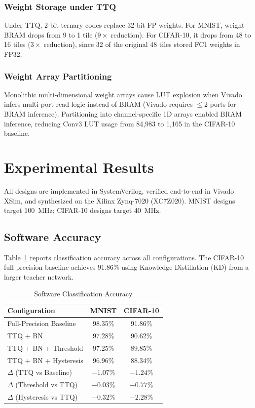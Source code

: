 \documentclass[conference]{IEEEtran}
\begin{document}
\subsubsection{Weight Storage under TTQ}
Under TTQ, 2-bit ternary codes replace 32-bit FP weights. For MNIST, weight BRAM drops from 9 to 1 tile ($9\times$ reduction). For CIFAR-10, it drops from 48 to 16 tiles ($3\times$ reduction), since 32 of the original 48 tiles stored FC1 weights in FP32.

\subsubsection{Weight Array Partitioning}
Monolithic multi-dimensional weight arrays cause LUT explosion when Vivado infers multi-port read logic instead of BRAM (Vivado requires $\leq$2 ports for BRAM inference). Partitioning into channel-specific 1D arrays enabled BRAM inference, reducing Conv3 LUT usage from 84,983 to 1,165 in the CIFAR-10 baseline.


\section{Experimental Results}
\label{sec:results}

All designs are implemented in SystemVerilog, verified end-to-end in Vivado XSim, and synthesized on the Xilinx Zynq-7020 (XC7Z020). MNIST designs target 100~MHz; CIFAR-10 designs target 40~MHz.

\subsection{Software Accuracy}

Table~\ref{tab:software_acc} reports classification accuracy across all configurations. The CIFAR-10 full-precision baseline achieves 91.86\% using Knowledge Distillation (KD) from a larger teacher network.

\begin{table}[H]
\centering
\caption{Software Classification Accuracy}
\label{tab:software_acc}
\begin{tabular}{lcc}
\toprule
\textbf{Configuration} & \textbf{MNIST} & \textbf{CIFAR-10} \\
\midrule
Full-Precision Baseline & 98.35\% & 91.86\% \\
TTQ + BN & 97.28\% & 90.62\% \\
TTQ + BN + Threshold & 97.25\% & 89.85\% \\
TTQ + BN + Hysteresis & 96.96\% & 88.34\% \\
\midrule
$\Delta$ (TTQ vs Baseline) & $-1.07\%$ & $-1.24\%$ \\
$\Delta$ (Threshold vs TTQ) & $-0.03\%$ & $-0.77\%$ \\
$\Delta$ (Hysteresis vs TTQ) & $-0.32\%$ & $-2.28\%$ \\
\bottomrule
\end{tabular}
\end{table}
\end{document}

